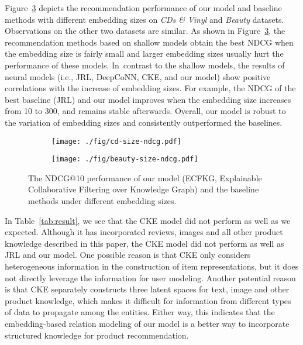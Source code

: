 \documentclass[algorithms,article,accept,moreauthors,pdftex,10pt,a4paper]{Definitions/mdpi}
\begin{document}
Figure~\ref{fig:embed} depicts the recommendation performance of our model and baseline methods with different embedding sizes on \textit{CDs \& Vinyl} and \textit{Beauty} datasets. Observations on the other two datasets are similar.
As shown in Figure~\ref{fig:embed}, the recommendation methods based on shallow models obtain the best NDCG when the embedding size is fairly small  and larger embedding sizes usually hurt the performance of these models.
In~contrast to the shallow models, the results of neural models (i.e., JRL, DeepCoNN, CKE, and our model) show positive correlations with the increase of embedding sizes.
For example, the NDCG of the best baseline (JRL) and our model improves when the embedding size increases from 10 to 300, and remains stable afterwards. 
Overall, our model is robust to the variation of embedding sizes and consistently outperformed the baselines.


\begin{figure}[H]
\begin{subfigure}[]{.4\textwidth}
		\centering
		\texttt{[image: ./fig/cd-size-ndcg.pdf]}\label{fig:cd_size}
	\end{subfigure}\hspace{40pt}
	\begin{subfigure}{.4\textwidth}
		\centering
		\texttt{[image: ./fig/beauty-size-ndcg.pdf]}\label{fig:be_size}
	\end{subfigure}\caption{The NDCG@10 performance of our model (ECFKG, Explainable Collaborative Filtering over Knowledge Graph) and the baseline methods under different embedding sizes.}
	\label{fig:embed}
\end{figure}

In Table~\ref{tab:result}, we see that the CKE model did not perform as well as we expected.
Although it has incorporated reviews, images and all other product knowledge described in this paper, the CKE model did not perform as well as JRL and our model.
One possible reason is that CKE only considers heterogeneous information in the construction of item representations, but it does not directly leverage the information for user modeling.
Another potential reason is that CKE separately constructs three latent spaces for text, image and other product knowledge, which makes it difficult for information from different types of data to propagate among the entities.
Either way, this indicates that the embedding-based relation modeling of our model is a better way to incorporate structured knowledge for product recommendation.
\end{document}
